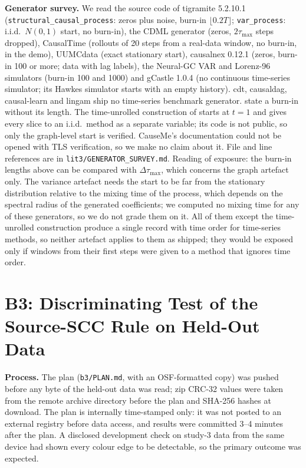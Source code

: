 \textbf{Generator survey.} We read the source code of tigramite 5.2.10.1
(\texttt{structural\_causal\_process}: zeros plus noise, burn-in
$\lfloor0.2T\rfloor$; \texttt{var\_process}: i.i.d.\ $N(0,1)$ start, no burn-in),
the CDML generator \citep{lawrence2021dgp} (zeros, $2\tau_{\max}$ steps dropped),
CausalTime \citep{cheng2024causaltime} (rollouts of 20 steps from a real-data
window, no burn-in, in the demo), UUMCdata \citep{herman2025unitless} (exact
stationary start), causalnex 0.12.1 (zeros, burn-in 100 or more; data with lag
labels), the Neural-GC VAR and Lorenz-96 simulators \citep{tank2021neural}
(burn-in 100 and 1000) and gCastle 1.0.4 (no continuous time-series
simulator; its Hawkes simulator starts with an empty history). cdt, causaldag,
causal-learn and lingam ship no time-series benchmark generator.
\citet{lohse2025sortability} state a burn-in without its length. The
time-unrolled construction of \citet{reisach2026topological} starts at $t=1$
and gives every slice to an i.i.d.\ method as a separate variable; its code is
not public, so only the graph-level start is verified. CauseMe's documentation
could not be opened with TLS verification, so we make no claim about it. File
and line references are in \texttt{lit3/GENERATOR\_SURVEY.md}. Reading of
exposure: the burn-in lengths above can be compared with
$\Delta\tau_{\max}$, which concerns the graph artefact only. The variance
artefact needs the start to be far from the stationary distribution relative
to the mixing time of the process, which depends on the spectral radius of
the generated coefficients; we computed no mixing time for any of these
generators, so we do not grade them on it. All of them except the
time-unrolled construction produce a single record with time order for
time-series methods, so neither artefact applies to them as shipped; they
would be exposed only if windows from their first steps were given to a
method that ignores time order.

\section{B3: Discriminating Test of the Source-SCC Rule on Held-Out Data}
\label{app:b3}

\textbf{Process.} The plan (\texttt{b3/PLAN.md}, with an OSF-formatted copy) was
pushed before any byte of the held-out data was read; zip CRC-32 values were
taken from the remote archive directory before the plan and SHA-256 hashes at
download. The plan is internally time-stamped only: it was not posted to an
external registry before data access, and results were committed 3--4 minutes
after the plan. A disclosed development check on study-3 data from the same
device had shown every colour edge to be detectable, so the primary outcome
was expected.

